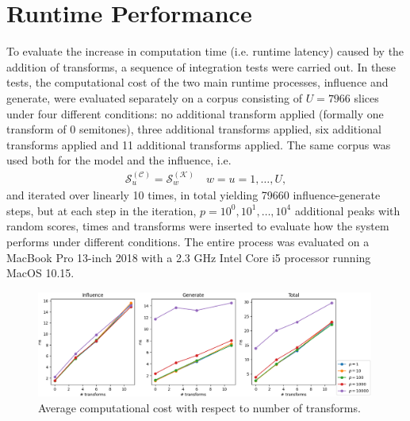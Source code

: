 \section{Runtime Performance}\label{ssec:transforms-performance}
To evaluate the increase in computation time (i.e. runtime latency) caused by the addition of transforms, a sequence of integration tests were carried out. In these tests, the computational cost of the two main runtime processes, influence and generate, were evaluated separately on a corpus consisting of $U=7966$ slices under four different conditions: no additional transform applied (formally one transform of 0 semitones), three additional transforms applied, six additional transforms applied and 11 additional transforms applied. The same corpus was used both for the model and the influence, i.e. 
	\begin{align}
		\mathcal S^{(\mathcal C)}_u = \mathcal S^{(\mathcal K)}_w \quad w = u = 	1,\dots,U,
	\end{align}
	and iterated over linearly 10 times, in total yielding 79660 influence-generate steps, but at each step in the iteration, $p = 10^0, 10^1, \dots, 10^4$ additional peaks with random scores, times and transforms were inserted to evaluate how the system performs under different conditions. The entire process was evaluated on a MacBook Pro 13-inch 2018 with a 2.3 GHz Intel Core i5 processor running MacOS 10.15.

	\begin{figure}[h!]
    \centering        
 	\includegraphics[width=0.99\textwidth]{Figures/evaluation_performance.png}
    \caption{Average computational cost with respect to number of transforms.}
    \label{fig:transform-evaluation}
	\end{figure}
	
